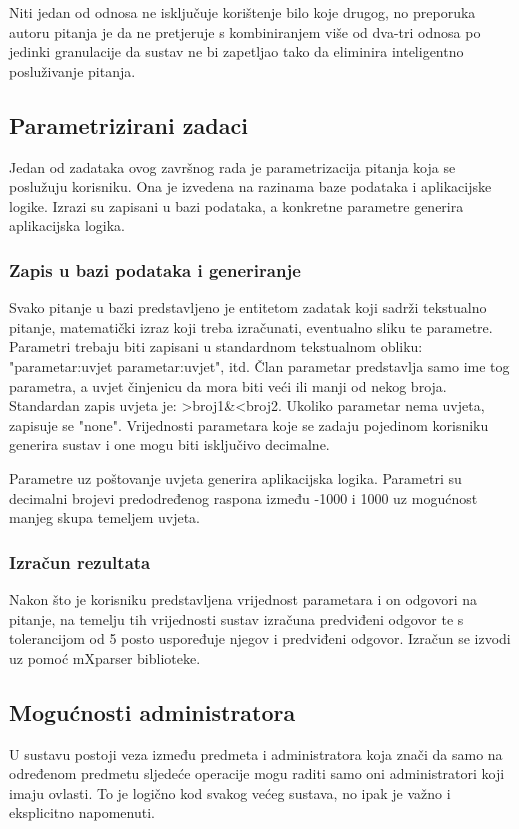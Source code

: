 \documentclass[times, utf8, zavrsni]{fer}
\begin{document}
Niti jedan od odnosa ne isključuje korištenje bilo koje drugog, no preporuka autoru pitanja je da ne pretjeruje s kombiniranjem više od dva-tri odnosa po jedinki granulacije da sustav ne bi zapetljao tako da eliminira inteligentno posluživanje pitanja.

\subsection{Parametrizirani zadaci}
Jedan od zadataka ovog završnog rada je parametrizacija pitanja koja se poslužuju korisniku. Ona je izvedena na razinama baze podataka i aplikacijske logike. Izrazi su zapisani u bazi podataka, a konkretne parametre generira aplikacijska logika.

\subsubsection{Zapis u bazi podataka i generiranje}
Svako pitanje u bazi predstavljeno je entitetom zadatak koji sadrži tekstualno pitanje, matematički izraz koji treba izračunati, eventualno sliku te parametre. Parametri trebaju biti zapisani u standardnom tekstualnom obliku: "parametar:uvjet parametar:uvjet", itd. Član parametar predstavlja samo ime tog parametra, a uvjet činjenicu da mora biti veći ili manji od nekog broja. Standardan zapis uvjeta je: >broj1\&<broj2. Ukoliko parametar nema uvjeta, zapisuje se "none". Vrijednosti parametara koje se zadaju pojedinom korisniku generira sustav i one mogu biti isključivo decimalne.
\par
Parametre uz poštovanje uvjeta generira aplikacijska logika. Parametri su decimalni brojevi predodređenog raspona između -1000 i 1000 uz mogućnost manjeg skupa temeljem uvjeta.

\subsubsection{Izračun rezultata}
Nakon što je korisniku predstavljena vrijednost parametara i on odgovori na pitanje, na temelju tih vrijednosti sustav izračuna predviđeni odgovor te s tolerancijom od 5 posto uspoređuje njegov i predviđeni odgovor. Izračun se izvodi uz pomoć mXparser biblioteke.

\subsection{Mogućnosti administratora}
U sustavu postoji veza između predmeta i administratora koja znači da samo na određenom predmetu sljedeće operacije mogu raditi samo oni administratori koji imaju ovlasti. To je logično kod svakog većeg sustava, no ipak je važno i eksplicitno napomenuti.
\end{document}
